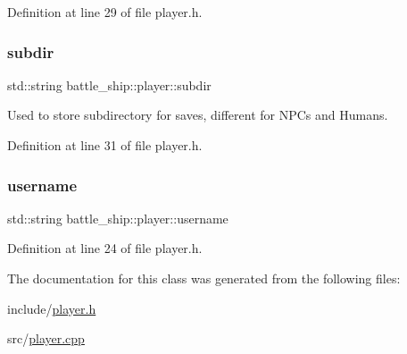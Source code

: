 Definition at line 29 of file player.\+h.

\mbox{\label{classbattle__ship_1_1player_a5cb155ee3d722244c44bf71e5e2440c4}} 
\subsubsection{\texorpdfstring{subdir}{subdir}}
{\footnotesize\ttfamily std\+::string battle\+\_\+ship\+::player\+::subdir\hspace{0.3cm}{\ttfamily [protected]}}



Used to store subdirectory for saves, different for N\+P\+Cs and Humans. 



Definition at line 31 of file player.\+h.

\mbox{\label{classbattle__ship_1_1player_aed786567891bcafecb8610e12fb5d413}} 
\subsubsection{\texorpdfstring{username}{username}}
{\footnotesize\ttfamily std\+::string battle\+\_\+ship\+::player\+::username\hspace{0.3cm}{\ttfamily [protected]}}



Definition at line 24 of file player.\+h.



The documentation for this class was generated from the following files\+:\begin{DoxyCompactItemize}
\item 
include/\hyperlink{player_8h}{player.\+h}\item 
src/\hyperlink{player_8cpp}{player.\+cpp}\end{DoxyCompactItemize}
